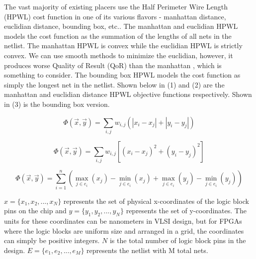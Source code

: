 \documentclass{article}
\begin{document}
    The vast majority of existing placers use the Half Perimeter Wire Length (HPWL) cost function in one of its various flavors - manhattan distance, euclidian distance, bounding box, etc..
    The manhattan and euclidian HPWL models the cost function as the summation of the lengths of all nets in the netlist. 
    The manhattan HPWL is convex while the euclidian HPWL is strictly convex.
    We can use smooth methods to minimize the euclidian, however, it produces worse Quality of Result (QoR) than the manhattan \cite{AP_2012}, which is something to consider.
    The bounding box HPWL models the cost function as simply the longest net in the netlist.
    Shown below in (1) and (2) are the manhattan and euclidian distance HPWL objective functions respectively.
    Shown in (3) is the bounding box version.

    \begin{equation}
        \Phi(\vec{x}, \vec{y}) = \sum_{i,j} w_{i,j} \left( |x_i - x_j| + |y_i - y_j| \right)
        \label{Manhattan}
    \end{equation}

    \begin{equation}
        \Phi(\vec{x}, \vec{y}) = \sum_{i,j} w_{i,j} \left[ (x_i - x_j)^2 + (y_i - y_j)^2 \right]
        \label{Euclidian}
    \end{equation}

    \begin{equation}
        \Phi(\vec{x}, \vec{y}) = \sum_{i=1}^{n} \left( \max_{j \in e_i} (x_j) - \min_{j \in e_i} (x_j) + \max_{j \in e_i} (y_j) - \min_{j \in e_i} (y_j) \right)
        \label{BoundingBox}
    \end{equation}

    \( x = \{ x_{1}, x_{2}, ..., x_{N} \} \) represents the set of physical x-coordinates of the logic block pins on the chip and \( y = \{ y_{1}, y_{2}, ..., y_{N} \} \) represents the set of y-coordinates.
    The units for these coordinates can be nanometers in VLSI design, but for FPGAs where the logic blocks are uniform size and arranged in a grid, the coordinates can simply be positive integers.
    \( N \) is the total number of logic block pins in the design. \( E = \{ e_{1}, e_{2}, ..., e_{M} \} \) represents the netlist with M total nets.
\end{document}

